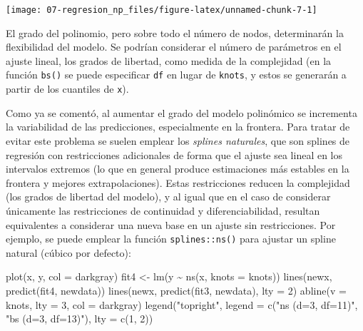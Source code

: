 \documentclass[
]{book}
\newenvironment{Shaded}{\begin{snugshade}}{\end{snugshade}}
\newcommand{\AttributeTok}[1]{\textcolor[rgb]{0.77,0.63,0.00}{#1}}
\newcommand{\DecValTok}[1]{\textcolor[rgb]{0.00,0.00,0.81}{#1}}
\newcommand{\FunctionTok}[1]{\textcolor[rgb]{0.00,0.00,0.00}{#1}}
\newcommand{\NormalTok}[1]{#1}
\newcommand{\OtherTok}[1]{\textcolor[rgb]{0.56,0.35,0.01}{#1}}
\newcommand{\SpecialCharTok}[1]{\textcolor[rgb]{0.00,0.00,0.00}{#1}}
\newcommand{\StringTok}[1]{\textcolor[rgb]{0.31,0.60,0.02}{#1}}
\theoremstyle{break}
\theoremstyle{definition}
\theoremstyle{definition}
\theoremstyle{definition}
\theoremstyle{definition}
\theoremstyle{remark}
\begin{document}
\begin{center}\texttt{[image: 07-regresion\_np\_files/figure-latex/unnamed-chunk-7-1]} \end{center}

El grado del polinomio, pero sobre todo el número de nodos, determinarán la flexibilidad del modelo.
Se podrían considerar el número de parámetros en el ajuste lineal, los grados de libertad, como medida de la complejidad (en la función \texttt{bs()} se puede especificar \texttt{df} en lugar de \texttt{knots}, y estos se generarán a partir de los cuantiles de \texttt{x}).

Como ya se comentó, al aumentar el grado del modelo polinómico se incrementa la variabilidad de las predicciones, especialmente en la frontera.
Para tratar de evitar este problema se suelen emplear los \emph{splines naturales}, que son splines de regresión con restricciones adicionales de forma que el ajuste sea lineal en los intervalos extremos (lo que en general produce estimaciones más estables en la frontera y mejores extrapolaciones).
Estas restricciones reducen la complejidad (los grados de libertad del modelo), y al igual que en el caso de considerar únicamente las restricciones de continuidad y diferenciabilidad, resultan equivalentes a considerar una nueva base en un ajuste sin restricciones.
Por ejemplo, se puede emplear la función \texttt{splines::ns()} para ajustar un spline natural (cúbico por defecto):

\begin{Shaded}
\begin{Highlighting}[]
\FunctionTok{plot}\NormalTok{(x, y, }\AttributeTok{col =} \StringTok{\textquotesingle{}darkgray\textquotesingle{}}\NormalTok{)}
\NormalTok{fit4 }\OtherTok{\textless{}{-}} \FunctionTok{lm}\NormalTok{(y }\SpecialCharTok{\textasciitilde{}} \FunctionTok{ns}\NormalTok{(x, }\AttributeTok{knots =}\NormalTok{ knots))}
\FunctionTok{lines}\NormalTok{(newx, }\FunctionTok{predict}\NormalTok{(fit4, newdata))}
\FunctionTok{lines}\NormalTok{(newx, }\FunctionTok{predict}\NormalTok{(fit3, newdata), }\AttributeTok{lty =} \DecValTok{2}\NormalTok{)}
\FunctionTok{abline}\NormalTok{(}\AttributeTok{v =}\NormalTok{ knots, }\AttributeTok{lty =} \DecValTok{3}\NormalTok{, }\AttributeTok{col =} \StringTok{\textquotesingle{}darkgray\textquotesingle{}}\NormalTok{)}
\FunctionTok{legend}\NormalTok{(}\StringTok{"topright"}\NormalTok{, }\AttributeTok{legend =} \FunctionTok{c}\NormalTok{(}\StringTok{"ns (d=3, df=11)"}\NormalTok{, }\StringTok{"bs (d=3, df=13)"}\NormalTok{), }\AttributeTok{lty =} \FunctionTok{c}\NormalTok{(}\DecValTok{1}\NormalTok{, }\DecValTok{2}\NormalTok{))}
\end{Highlighting}
\end{Shaded}
\end{document}
